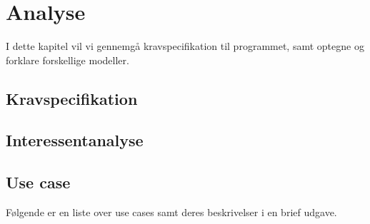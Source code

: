 \chapter{Analyse}

I dette kapitel vil vi gennemgå kravspecifikation til programmet, samt optegne og forklare forskellige modeller.


\section{Kravspecifikation}



\section{Interessentanalyse}

\newpage

\section{Use case}

Følgende er en liste over use cases samt deres beskrivelser i en brief udgave.


